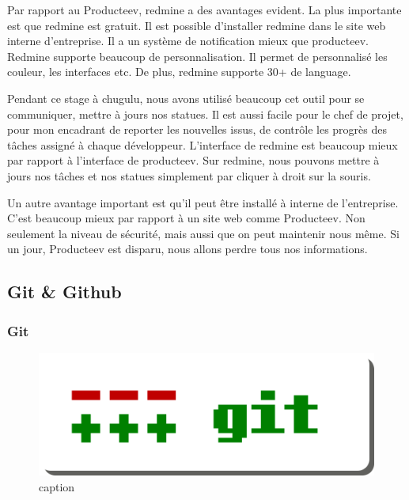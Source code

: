 Par rapport au Producteev, redmine a des avantages evident. La plus importante est que redmine est gratuit. Il est possible d'installer redmine dans le site web interne d'entreprise. Il a un système de notification mieux que producteev. Redmine supporte beaucoup de personnalisation. Il permet de personnalisé les couleur, les interfaces etc. De plus, redmine supporte 30+ de language. 

Pendant ce stage à chugulu, nous avons utilisé beaucoup cet outil pour se communiquer, mettre à jours nos statues. Il est aussi facile pour le chef de projet, pour mon encadrant de reporter les nouvelles issus, de contrôle les progrès des tâches assigné à chaque développeur. L'interface de redmine est beaucoup mieux par rapport à l'interface de producteev. Sur redmine, nous pouvons mettre à jours nos tâches et nos statues simplement par cliquer à droit sur la souris. 

Un autre avantage important est qu'il peut être installé à interne de l'entreprise. C'est beaucoup mieux par rapport à un site web comme Producteev. Non seulement la niveau de sécurité, mais aussi que on peut maintenir nous même. Si un jour, Producteev est disparu, nous allons perdre tous nos informations.



\subsection{Git \& Github} %

\subsubsection{Git} %


\begin{figure}[htbp]
	\centering
		\includegraphics[width=6in]{Image/GitLogo.png}
	\caption{caption}
	\label{fig:Image_GitLogo}
\end{figure}

